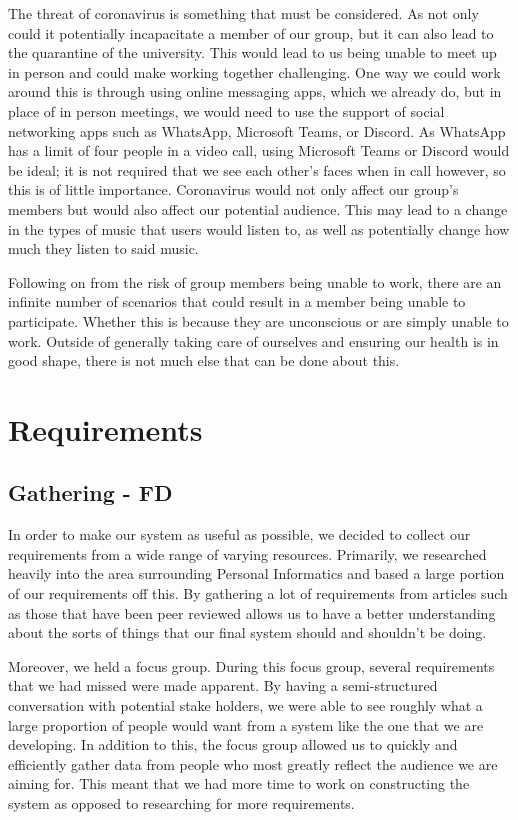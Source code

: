 \documentclass[11pt]{report}
\begin{document}
The threat of coronavirus is something that must be considered.  As not only could it potentially incapacitate a member of our group, but it can also lead to the quarantine of the university.  This would lead to us being unable to meet up in person and could make working together challenging.  One way we could work around this is through using online messaging apps, which we already do, but in place of in person meetings, we would need to use the support of social networking apps such as WhatsApp, Microsoft Teams, or Discord.  As WhatsApp has a limit of four people in a video call, using Microsoft Teams or Discord would be ideal; it is not required that we see each other’s faces when in call however, so this is of little importance.  Coronavirus would not only affect our group’s members but would also affect our potential audience.  This may lead to a change in the types of music that users would listen to, as well as potentially change how much they listen to said music.  

Following on from the risk of group members being unable to work, there are an infinite number of scenarios that could result in a member being unable to participate.  Whether this is because they are unconscious or are simply unable to work.  Outside of generally taking care of ourselves and ensuring our health is in good shape, there is not much else that can be done about this.


\chapter{Requirements}

\section{Gathering - FD}

In order to make our system as useful as possible, we decided to collect our requirements from a wide range of varying resources. Primarily, we researched heavily into the area surrounding Personal Informatics and based a large portion of our requirements off this. By gathering a lot of requirements from articles such as those that have been peer reviewed allows us to have a better understanding about the sorts of things that our final system should and shouldn’t be doing.

Moreover, we held a focus group. During this focus group, several requirements that we had missed were made apparent. By having a semi-structured conversation with potential stake holders, we were able to see roughly what a large proportion of people would want from a system like the one that we are developing. In addition to this, the focus group allowed us to quickly and efficiently gather data from people who most greatly reflect the audience we are aiming for. This meant that we had more time to work on constructing the system as opposed to researching for more requirements.
\end{document}
